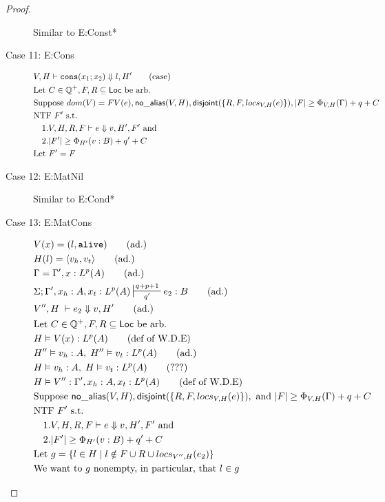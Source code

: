 \documentclass[11pt]{article}
\newcommand{\ms}[1]{\ensuremath{\mathsf{#1}}}
\newcommand{\irl}[1]{\mathtt{#1}}
\newcommand{\na}[1]{\mathsf{no\_alias}(#1)}
\newcommand{\dist}[1]{\mathsf{disjoint}(#1)}
\theoremstyle{definition}
\begin{document}
\begin{proof}
\begin{description}
  Similar to E:Const*
  \item[Case 11: E:Cons]
  \begin{align*}
  &V,H \vdash \consexabt{x_1}{x_2} \Downarrow l, H' \tag{case}\\
  &\text{Let } C \in \mathbb{Q}^+, F,R \subseteq \ms{Loc} \text{ be arb.}\\
  &\text{Suppose } dom(V) = FV(e), \na{V,H}, \dist{\{R,F,locs_{V,H}(e)\}}, |F| \ge \Phi_{V,H}(\Gamma) + q + C\\
  &\text{NTF } F' \text{ s.t. }\\
  &\quad 1. V,H,R,F \vdash e \Downarrow v, H',F' \text{ and }\\ 
  &\quad 2. |F'| \ge \Phi_{H'}(v:B) + q' + C\\
  &\text{Let } F' = F \ 
  \end{align*}
  \item[Case 12: E:MatNil]
  Similar to E:Cond*
  \item[Case 13: E:MatCons]
  \begin{align*}
  &V(x) = (l,\irl{alive}) \tag{ad.}\\
  &H(l) = \pairexcst{v_h}{v_t} \tag{ad.}\\
  &\Gamma = \Gamma', x : L^p(A) \tag{ad.}\\
  &\Sigma; \Gamma', x_h : A, x_t : L^p(A) \sststile{q'}{q + p + 1} e_2 : B \tag{ad.}\\
  &V'',H \; \vdash e_2 \Downarrow v, H' \tag{ad.}\\
  &\text{Let } C \in \mathbb{Q}^+, F,R \subseteq \ms{Loc} \text{ be arb.}\\
  &H \vDash V(x) : L^p(A) \tag{def of W.D.E}\\
  &H''\vDash v_h : A,\; H'' \vDash v_t : L^p(A) \tag{ad.}\\
  &H\vDash v_h : A,\; H \vDash v_t : L^p(A) \tag{???}\\
  &H \vDash V'' : \Gamma', x_h : A, x_t : L^p(A) \tag{def of W.D.E}\\
  &\text{Suppose }  \na{V,H}, \dist{\{R,F,locs_{V,H}(e)\}}, \text{ and } |F| \ge \Phi_{V,H}(\Gamma) + q + C\\
  &\text{NTF } F' \text{ s.t. }\\
  &\quad 1. V,H,R,F \vdash e \Downarrow v, H',F' \text{ and }\\ 
  &\quad 2. |F'| \ge \Phi_{H'}(v:B) + q' + C\\
  &\text{Let } g = \{l \in H \mid l \notin F \cup R \cup locs_{V'',H}(e_2)\}\\
  &\text{We want to $g$ nonempty, in particular, that } l \in g\\

\end{align*}
\end{description}
\end{proof}
\end{document}
